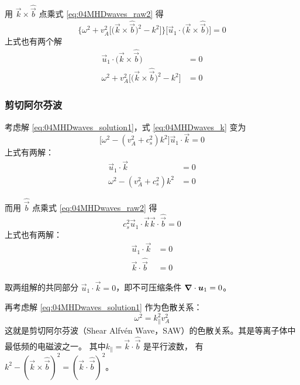用 $\vec{k} \times \hat{\vec{b}}$ 点乘式 \ref{eq:04MHDwaves_raw2} 得
\begin{equation}
\bigg\{\omega^2 + v_A^2 \Big[ \big(\vec{k} \times \hat{\vec{b}} \big)^2 - k^2\Big] \bigg\}
\Big[ \vec{u}_1 \cdot \big(\vec{k} \times \hat{\vec{b}} \big) \Big] = 0
\end{equation}
上式也有两个解
\begin{subequations}\begin{align}
\vec{u}_1 \cdot \big(\vec{k} \times \hat{\vec{b}} \big) &= 0
\label{eq:04MHDwaves_solution3} \\
\omega^2 + v_A^2 \Big[ \big(\vec{k} \times \hat{\vec{b}} \big)^2 - k^2\Big] &= 0
\label{eq:04MHDwaves_solution4}
\end{align}\end{subequations}

\subsubsection{剪切阿尔芬波}

考虑解 \ref{eq:04MHDwaves_solution1}，式 \ref{eq:04MHDwaves_k} 变为
\begin{equation}
\big[\omega^2 - (v_A^2 + c_s^2) k^2 \big] \vec{u}_1 \cdot \vec{k} = 0
\end{equation}
上式有两解：
\begin{subequations}\begin{align}
\vec{u}_1 \cdot \vec{k} &= 0 \\
\omega^2 - (v_A^2 + c_s^2) k^2 &= 0
\end{align}\end{subequations}

而用 $\hat{\vec{b}}$ 点乘式 \ref{eq:04MHDwaves_raw2} 得
\begin{equation}
c_s^2 \vec{u}_1 \cdot \vec{k} \vec{k} \cdot \hat{\vec{b}} = 0
\end{equation}
上式也有两解：
\begin{subequations}\begin{align}
\vec{u}_1 \cdot \vec{k} &= 0 \\
\vec{k} \cdot \hat{\vec{b}} &= 0
\end{align}\end{subequations}

取两组解的共同部分 $\vec{u}_1 \cdot \vec{k} = 0$，即不可压缩条件 $\bm{\nabla} \cdot{\bm{u}_1} = 0$。

再考虑解 \ref{eq:04MHDwaves_solution1} 作为色散关系：
\begin{equation} \label{eq:04MHDwaves_SAW}
\omega^2 = k_\parallel^2 v_A^2
\end{equation}
这就是剪切阿尔芬波（Shear Alfvén Wave，SAW）的色散关系。其是等离子体中最低频的电磁波之一。
其中$k_\parallel = \vec{k} \cdot \hat{\vec{b}}$ 是平行波数，
有 $k^2 - (\vec{k} \times \hat{\vec{b}})^2 = (\vec{k} \cdot \hat{\vec{b}})^2$。

